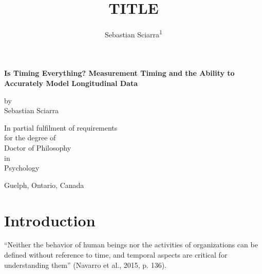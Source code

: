 \documentclass[
  english,
  man,floatsintext]{apa7}
\title{TITLE}
\author{Sebastian Sciarra\textsuperscript{1}}
\date{}
\affiliation{\vspace{0.5cm}\textsuperscript{1} University of Guelph}
\begin{document}
\maketitle

\newpage
\vspace*{-\topskip}
\vspace*{\fill}
\nointerlineskip

\begin{titlepage}
  \begin{center}
    \vspace*{3cm}
    
  \textbf{Is Timing Everything? Measurement Timing and the Ability to Accurately Model Longitudinal Data}
    
  \vspace{2cm} 
    by \\ Sebastian Sciarra 
    
      
  \vspace{2cm} 
   In partial fulfilment of requirements \\ 
   for the degree of \\
   Doctor of Philosophy \\ 
   in \\ 
   Psychology
    

  \vspace{2cm} 
    Guelph, Ontario, Canada \\ 
    \textcopyright {}

  
  \end{center}
\end{titlepage}

\newpage
\vspace*{-\topskip}
\vspace*{\fill}
\nointerlineskip

\hypertarget{introduction}{%
\section{Introduction}\label{introduction}}

\nointerlineskip
\vfill
\newpage

``Neither the behavior of human beings nor the activities of organizations can be defined without reference to time, and temporal aspects are critical for understanding them'' (Navarro et al., 2015, p. 136).
\end{document}

